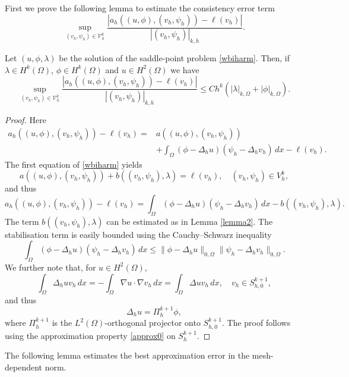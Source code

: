 \documentclass[a4paper,final]{siamltex}
\newcommand{\CV}{\mathcal{V}}
\def\snorm#1#2{|#1|_{#2}}
\begin{document}
First we prove the following lemma to estimate  the consistency error term
\[ \sup_{(v_h,\psi_h) \in \CV^k_h} \frac{|a_h((u,\phi), (v_h,\psi_h))-\ell(v_h)|}
{\snorm{(v_h,\psi_h)}{k,h}}.\]
\begin{lemma}\label{lemma5} 
Let $(u,\phi,{\lambda})$ be the solution of the saddle-point problem 
\eqref{wbiharm}.  Then, if $\lambda \in H^k(\Omega)$, $\phi \in H^k(\Omega)$  and $ u \in H^2(\Omega)$ we have 
\[ \sup_{(v_h,\psi_h) \in \CV^k_h} \frac{|a_h((u,\phi), (v_h,\psi_h))-\ell(v_h)|}
{\snorm{(v_h,\psi_h)}{k,h}}\leq C h^k \left(|\lambda|_{k,\Omega} +|\phi|_{k,\Omega} \right). \]
\end{lemma}
\begin{proof}
Here 
\begin{align*}
a_h((u,\phi), (v_h,\psi_h))-\ell(v_h) ={}& a((u,\phi), (v_h,\psi_h))\\
&+ \int_{\Omega} (\phi - \Delta_h u) (\psi_h -\Delta_h v_h) \,dx
-\ell(v_h).
\end{align*}
The first equation of  \eqref{wbiharm} yields
\[ a((u,\phi), (v_h,\psi_h)) + b((v_h,\psi_h),\lambda) = \ell(v_h) ,\quad (v_h,\psi_h) \in V^k_h,\]
and thus 
\[ a_h((u,\phi), (v_h,\psi_h))-\ell(v_h) =   \int_{\Omega} (\phi - \Delta_h u) (\psi_h -\Delta_h v_h) \,dx-b((v_h,\psi_h),\lambda).\]
The term $b((v_h,\psi_h),\lambda)$ can be estimated as in Lemma \ref{lemma2}. 
The stabilisation term is easily bounded using the Cauchy--Schwarz inequality 
\[ \int_{\Omega} (\phi - \Delta_h u) (\psi_h -\Delta_h v_h) \,dx \leq 
\|\phi - \Delta_h u\|_{0,\Omega} \|\psi_h - \Delta_h v_h\|_{0,\Omega}.\]
We further note that, for $u \in H^2(\Omega)$,
\[ \int_{\Omega} \Delta_h u v_h\,dx = - \int_{\Omega} \nabla u \cdot \nabla v_h \,dx = 
\int_{\Omega} \Delta u v_h\,dx,\quad v_h \in S_{h,0}^{k+1},\]
and thus 
\[ \Delta_h u = \Pi_h^{k+1} \phi,\]
where $\Pi_h^{k+1}$ is the $L^2(\Omega)$-orthogonal projector onto $S^{k+1}_{h,0}$.
The proof follows using the approximation property \eqref{approx0} on
$S^{k+1}_{h}$. 
\end{proof}

The following lemma estimates the best approximation error in the mesh-depen\-dent norm.
\end{document}
